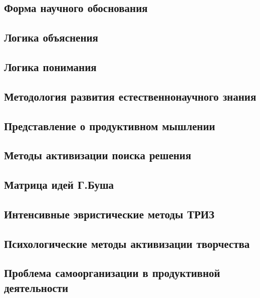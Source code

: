 \documentclass[main.tex]{subfiles}
\begin{document}

\subsection{Форма научного обоснования}


\subsection{Логика объяснения}



\subsection{Логика понимания}


\subsection{Методология развития естественнонаучного знания}


\subsection{Представление о продуктивном мышлении}


\subsection{Методы активизации поиска решения}




\subsection{Матрица идей Г.Буша}


\subsection{Интенсивные эвристические методы ТРИЗ}


\subsection{Психологические методы активизации творчества}




\subsection{Проблема самоорганизации в продуктивной деятельности}

\end{document}
